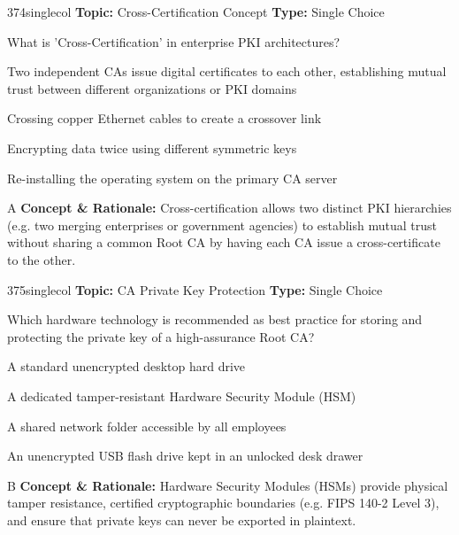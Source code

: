 \begin{qcard}{374}{singlecol}
\textcolor{darkslate!75}{\small\textbf{Topic:} Cross-Certification Concept \hfill \textbf{Type:} Single Choice}\vspace{0.4em}\par
What is 'Cross-Certification' in enterprise PKI architectures?
\begin{qoptions}
\item Two independent CAs issue digital certificates to each other, establishing mutual trust between different organizations or PKI domains
\item Crossing copper Ethernet cables to create a crossover link
\item Encrypting data twice using different symmetric keys
\item Re-installing the operating system on the primary CA server
\end{qoptions}
\end{qcard}
\nopagebreak
\begin{explainbox}{A}
\textbf{Concept \& Rationale:} Cross-certification allows two distinct PKI hierarchies (e.g. two merging enterprises or government agencies) to establish mutual trust without sharing a common Root CA by having each CA issue a cross-certificate to the other.
\end{explainbox}

\begin{qcard}{375}{singlecol}
\textcolor{darkslate!75}{\small\textbf{Topic:} CA Private Key Protection \hfill \textbf{Type:} Single Choice}\vspace{0.4em}\par
Which hardware technology is recommended as best practice for storing and protecting the private key of a high-assurance Root CA?
\begin{qoptions}
\item A standard unencrypted desktop hard drive
\item A dedicated tamper-resistant Hardware Security Module (HSM)
\item A shared network folder accessible by all employees
\item An unencrypted USB flash drive kept in an unlocked desk drawer
\end{qoptions}
\end{qcard}
\nopagebreak
\begin{explainbox}{B}
\textbf{Concept \& Rationale:} Hardware Security Modules (HSMs) provide physical tamper resistance, certified cryptographic boundaries (e.g. FIPS 140-2 Level 3), and ensure that private keys can never be exported in plaintext.
\end{explainbox}

